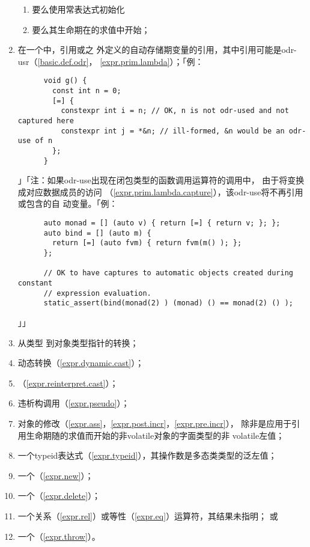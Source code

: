 \begin{enumerate}
{    \begin{enumerate}
      \item{要么使用常表达式初始化}
      \item{要么其生命期在的求值中开始；}
    \end{enumerate}}
  \item{在一个中，引用或之
    外定义的自动存储期变量的引用，其中引用可能是odr-usr（\ref{basic.def.odr}，
    \ref{expr.prim.lambda}）；「例：
    \begin{lstlisting}
      void g() {
        const int n = 0;
        [=] {
          constexpr int i = n; // OK, n is not odr-used and not captured here
          constexpr int j = *&n; // ill-formed, &n would be an odr-use of n
        };
      }
    \end{lstlisting}」「注：如果odr-use出现在闭包类型的函数调用运算符的调用中，
    由于将变换成对应数据成员的访问
    （\ref{expr.prim.lambda.capture}），该odr-use将不再引用或包含的自
    动变量。「例：
    \begin{lstlisting}
      auto monad = [] (auto v) { return [=] { return v; }; };
      auto bind = [] (auto m) {
        return [=] (auto fvm) { return fvm(m() ); };
      };

      // OK to have captures to automatic objects created during constant
      // expression evaluation.
      static_assert(bind(monad(2) ) (monad) () == monad(2) () );
    \end{lstlisting}」」}
  \item{从类型 到对象类型指针的转换；}
  \item{动态转换（\ref{expr.dynamic.cast}）；}
  \item{（\ref{expr.reinterpret.cast}）；}
  \item{违析构调用（\ref{expr.pseudo}）；}
  \item{对象的修改（\ref{expr.ass}，\ref{expr.post.incr}，\ref{expr.pre.incr}），
    除非是应用于引用生命期随的求值而开始的非volatile对象的字面类型的非
    volatile左值；}
  \item{一个typeid表达式（\ref{expr.typeid}），其操作数是多态类类型的泛左值；}
  \item{一个（\ref{expr.new}）；}
  \item{一个（\ref{expr.delete}）；}
  \item{一个关系（\ref{expr.rel}）或等性（\ref{expr.eq}）运算符，其结果未指明；
    或}
  \item{一个（\ref{expr.throw}）。}
\end{enumerate}
